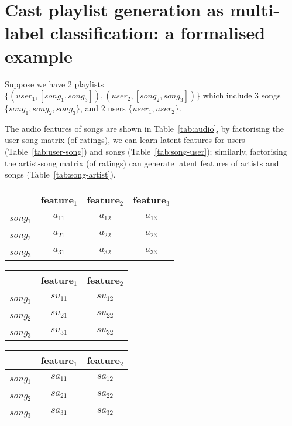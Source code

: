 \section{Cast playlist generation as multi-label classification: a formalised example}

Suppose we have 
2 playlists $\{(\textit{user}_1, [\textit{song}_1, \textit{song}_3]), (\textit{user}_2, [\textit{song}_2, \textit{song}_3])\}$
which include 
3 songs $\{\textit{song}_1, \textit{song}_2, \textit{song}_3\}$,
and 2 users $\{\textit{user}_1, \textit{user}_2\}$.

The audio features of songs are shown in Table~\ref{tab:audio}, by factorising the user-song matrix (of ratings), 
we can learn latent features for users (Table~\ref{tab:user-song}) and songs (Table~\ref{tab:song-user});
similarly, factorising the artist-song matrix (of ratings) can generate latent features of artists and songs (Table~\ref{tab:song-artist}).

\vspace{1em}
\begin{minipage}[t][3em][b]{.35\linewidth}
\begin{tabular}{l|ccc} \hline \hline 
& feature$_1$ & feature$_2$ & feature$_3$ \\ \hline 
{\it song}$_1$ & $a_{11}$ & $a_{12}$ & $a_{13}$ \\
{\it song}$_2$ & $a_{21}$ & $a_{22}$ & $a_{23}$ \\
{\it song}$_3$ & $a_{31}$ & $a_{32}$ & $a_{33}$ \\ \hline
\end{tabular}
\label{tab:audio}
\end{minipage}
%
\quad
%
\begin{minipage}{.31\linewidth}
\begin{tabular}{l|cc} \hline \hline 
& feature$_1$ & feature$_2$ \\ \hline
{\it song}$_1$ & $su_{11}$ & $su_{12}$ \\
{\it song}$_2$ & $su_{21}$ & $su_{22}$ \\
{\it song}$_3$ & $su_{31}$ & $su_{32}$ \\ \hline
\end{tabular}
\label{tab:song-user}
\end{minipage}
%
\quad
%
\begin{minipage}{.31\linewidth}
\begin{tabular}{l|cc} \hline \hline 
& feature$_1$ & feature$_2$ \\ \hline 
{\it song}$_1$ & $sa_{11}$ & $sa_{12}$ \\
{\it song}$_2$ & $sa_{21}$ & $sa_{22}$ \\
{\it song}$_3$ & $sa_{31}$ & $sa_{32}$ \\ \hline
\end{tabular}
\label{tab:song-artist}
\end{minipage}


